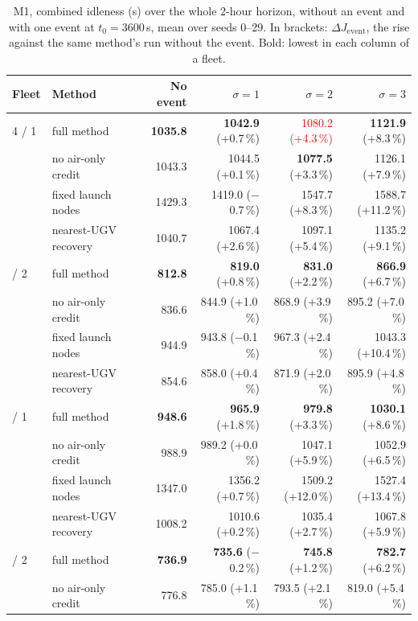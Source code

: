 \documentclass[11pt]{article}
\newcommand{\tie}[1]{\textcolor{red}{#1}}
\theoremstyle{definition}
\theoremstyle{plain}
\begin{document}
\begin{table}[H]
\centering
\small
\caption{M1, combined idleness (s) over the whole 2-hour horizon, without an event and with one event at $t_0 = 3600$\,s, mean over seeds 0--29. In brackets: $\Delta J_{\mathrm{event}}$, the rise against the same method's run without the event. Bold: lowest in each column of a fleet.}
\label{tab:m1ev}
\begin{tabular}{llrrrr}
\toprule
Fleet & Method & No event & $\sigma = 1$ & $\sigma = 2$ & $\sigma = 3$ \\
\midrule
4 / 1 & full method & \textbf{1035.8} & \textbf{1042.9} (+0.7\,\%) & \tie{1080.2 (+4.3\,\%)} & \textbf{1121.9} (+8.3\,\%) \\
 & no air-only credit & 1043.3 & 1044.5 (+0.1\,\%) & \textbf{1077.5} (+3.3\,\%) & 1126.1 (+7.9\,\%) \\
 & fixed launch nodes & 1429.3 & 1419.0 ($-$0.7\,\%) & 1547.7 (+8.3\,\%) & 1588.7 (+11.2\,\%) \\
 & nearest-UGV recovery & 1040.7 & 1067.4 (+2.6\,\%) & 1097.1 (+5.4\,\%) & 1135.2 (+9.1\,\%) \\
\addlinespace
4 / 2 & full method & \textbf{812.8} & \textbf{819.0} (+0.8\,\%) & \textbf{831.0} (+2.2\,\%) & \textbf{866.9} (+6.7\,\%) \\
 & no air-only credit & 836.6 & 844.9 (+1.0\,\%) & 868.9 (+3.9\,\%) & 895.2 (+7.0\,\%) \\
 & fixed launch nodes & 944.9 & 943.8 ($-$0.1\,\%) & 967.3 (+2.4\,\%) & 1043.3 (+10.4\,\%) \\
 & nearest-UGV recovery & 854.6 & 858.0 (+0.4\,\%) & 871.9 (+2.0\,\%) & 895.9 (+4.8\,\%) \\
\addlinespace
5 / 1 & full method & \textbf{948.6} & \textbf{965.9} (+1.8\,\%) & \textbf{979.8} (+3.3\,\%) & \textbf{1030.1} (+8.6\,\%) \\
 & no air-only credit & 988.9 & 989.2 (+0.0\,\%) & 1047.1 (+5.9\,\%) & 1052.9 (+6.5\,\%) \\
 & fixed launch nodes & 1347.0 & 1356.2 (+0.7\,\%) & 1509.2 (+12.0\,\%) & 1527.4 (+13.4\,\%) \\
 & nearest-UGV recovery & 1008.2 & 1010.6 (+0.2\,\%) & 1035.4 (+2.7\,\%) & 1067.8 (+5.9\,\%) \\
\addlinespace
5 / 2 & full method & \textbf{736.9} & \textbf{735.6} ($-$0.2\,\%) & \textbf{745.8} (+1.2\,\%) & \textbf{782.7} (+6.2\,\%) \\
 & no air-only credit & 776.8 & 785.0 (+1.1\,\%) & 793.5 (+2.1\,\%) & 819.0 (+5.4\,\%) \\

\end{tabular}
\end{table}
\end{document}
